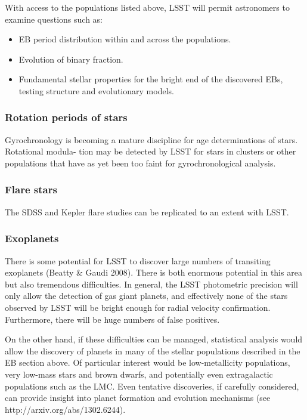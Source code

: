 With access to the populations listed above, LSST will permit astronomers to examine questions such as: 
\begin{itemize}
\item EB period distribution within and across the populations. 
\item Evolution of binary fraction. 
\item Fundamental stellar properties for the bright end of the discovered EBs, testing structure and evolutionary models. 
\end{itemize}

\subsubsection{Rotation periods of stars }

Gyrochronology is becoming a mature discipline for age determinations of stars. Rotational modula- tion may be detected by LSST for stars in clusters or other populations that have as yet been too faint for gyrochronological analysis. 

\subsubsection{Flare stars }

The SDSS and Kepler flare studies can be replicated to an extent with LSST. 

\subsubsection{Exoplanets }

There is some potential for LSST to discover large numbers of transiting exoplanets (Beatty \& Gaudi 2008). There is both enormous potential in this area but also tremendous difficulties. In general, the LSST photometric precision will only allow the detection of gas giant planets, and effectively none of the stars observed by LSST will be bright enough for radial velocity confirmation. Furthermore, there will be huge numbers of false positives. 

On the other hand, if these difficulties can be managed, statistical analysis would allow the discovery of planets in many of the stellar populations described in the EB section above. Of particular interest would be low-metallicity populations, very low-mass stars and brown dwarfs, and potentially even extragalactic populations such as the LMC. Even tentative discoveries, if carefully considered, can provide insight into planet formation and evolution mechanisms (see http://arxiv.org/abs/1302.6244). 


